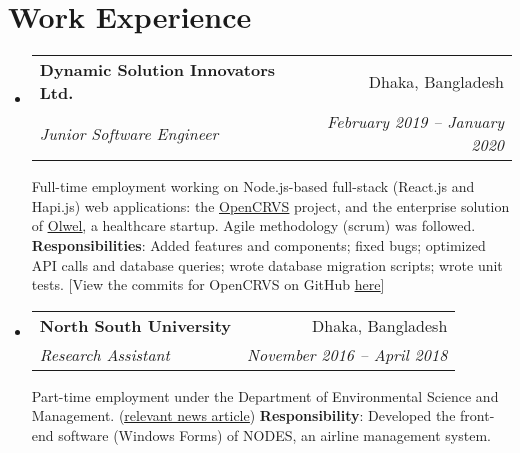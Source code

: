 \documentclass[letter-paper,10pt]{article}
\makeatletter
\newcommand{\resumeItem}[2]{
  \item\small{
    \textbf{#1}{: #2 \vspace{-2pt}}
  }
}
\newcommand{\resumeSubheading}[4]{
  \vspace{-1pt}\item
    \begin{tabular*}{0.97\textwidth}[t]{l@{\extracolsep{\fill}}r}
      \textbf{#1} & #2 \\
      \textit{#3} & \textit{ #4} \\
    \end{tabular*}\vspace{-5pt}
}
\newcommand{\resumeSubSubheading}[2]{
    \begin{tabular*}{0.97\textwidth}{l@{\extracolsep{\fill}}r}
      \textit{\small#1} & \textit{\small #2} \\
    \end{tabular*}\vspace{-5pt}
}
\newcommand{\resumeSubHeadingListStart}{\begin{itemize}[leftmargin=*]}
\newcommand{\resumeSubHeadingListEnd}{\end{itemize}}
\newcommand{\resumeItemListStart}{\begin{itemize}}
\newcommand{\resumeItemListEnd}{\end{itemize}\vspace{-5pt}}
\makeatother
\begin{document}
\section{Work Experience}
  \resumeSubHeadingListStart

    \resumeSubheading
      {Dynamic Solution Innovators Ltd.}{Dhaka, Bangladesh}
      {Junior Software Engineer}{February 2019 -- January 2020}
      
      Full-time employment working on Node.js-based full-stack (React.js and Hapi.js) web applications: the \href{https://opencrvs.org}{\underline{OpenCRVS}} project, and the enterprise solution of \href{https://olwel.com}{\underline{Olwel}}, a healthcare startup. Agile methodology (scrum) was followed.
      \newline
      \textbf{Responsibilities}: Added features and components; fixed bugs; optimized API calls and database queries; wrote database migration scripts; wrote unit tests. [View the commits for OpenCRVS on GitHub \href{https://github.com/opencrvs/opencrvs-core/commits?author=maacpiash}{\underline{here}}]
      

    \resumeSubheading
      {North South University}{Dhaka, Bangladesh}
      {Research Assistant}{November 2016 -- April 2018}
      
      Part-time employment under the Department of Environmental Science and Management. (\href{http://www.ipsnews.net/2017/05/flying-green-in-bangladesh/}{\underline{relevant news article}})
      \newline
      \textbf{Responsibility}: Developed the front-end software (Windows Forms) of NODES, an airline management system.
     
  \resumeSubHeadingListEnd
  
\end{document}
